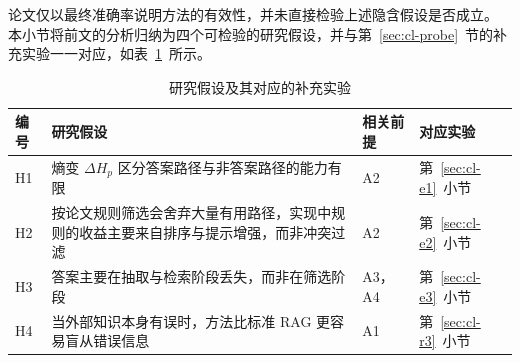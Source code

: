 论文仅以最终准确率说明方法的有效性，并未直接检验上述隐含假设是否成立。
本小节将前文的分析归纳为四个可检验的研究假设，并与第~\ref{sec:cl-probe}~节的补充实验一一对应，如表~\ref{tab:cl-hypo}~所示。

\begin{table}[htbp]
  \centering
  \small
  \renewcommand{\arraystretch}{1.35}
  \caption{研究假设及其对应的补充实验}
  \label{tab:cl-hypo}
  \begin{tabular}{>{\centering\arraybackslash}p{0.8cm}
                  >{\raggedright\arraybackslash}p{9.4cm}
                  >{\centering\arraybackslash}p{1.8cm}
                  >{\centering\arraybackslash}p{2.2cm}}
    \toprule
    编号 & 研究假设 & 相关前提 & 对应实验 \\
    \midrule
    H1 & 熵变 $\Delta H_p$ 区分答案路径与非答案路径的能力有限 & A2 & 第~\ref{sec:cl-e1}~小节 \\
    H2 & 按论文规则筛选会舍弃大量有用路径，实现中规则的收益主要来自排序与提示增强，而非冲突过滤 & A2 & 第~\ref{sec:cl-e2}~小节 \\
    H3 & 答案主要在抽取与检索阶段丢失，而非在筛选阶段 & A3，A4 & 第~\ref{sec:cl-e3}~小节 \\
    H4 & 当外部知识本身有误时，方法比标准 RAG 更容易盲从错误信息 & A1 & 第~\ref{sec:cl-r3}~小节 \\
    \bottomrule
  \end{tabular}
\end{table}
